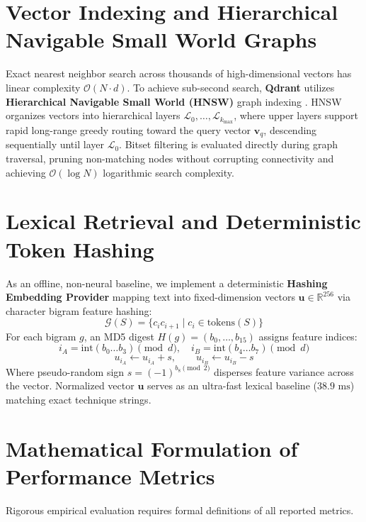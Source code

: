\section{Vector Indexing and Hierarchical Navigable Small World Graphs}
\label{sec:theory_hnsw}
Exact nearest neighbor search across thousands of high-dimensional vectors has linear complexity $\mathcal{O}(N \cdot d)$. To achieve sub-second search, \textbf{Qdrant} utilizes \textbf{Hierarchical Navigable Small World (HNSW)} graph indexing \cite{malkov2018hnsw}. HNSW organizes vectors into hierarchical layers $\mathcal{L}_0, \dots, \mathcal{L}_{k_{\text{max}}}$, where upper layers support rapid long-range greedy routing toward the query vector $\mathbf{v}_q$, descending sequentially until layer $\mathcal{L}_0$. Bitset filtering is evaluated directly during graph traversal, pruning non-matching nodes without corrupting connectivity and achieving $\mathcal{O}(\log N)$ logarithmic search complexity.

\section{Lexical Retrieval and Deterministic Token Hashing}
\label{sec:theory_hashing}
As an offline, non-neural baseline, we implement a deterministic \textbf{Hashing Embedding Provider} mapping text into fixed-dimension vectors $\mathbf{u} \in \mathbb{R}^{256}$ via character bigram feature hashing:
\begin{equation}
\label{eq:ngrams}
\mathcal{G}(S) = \{c_i c_{i+1} \mid c_i \in \text{tokens}(S)\}
\end{equation}
For each bigram $g$, an MD5 digest $H(g) = (b_0, \dots, b_{15})$ assigns feature indices:
\begin{equation}
\label{eq:hash_indices}
i_A = \text{int}(b_0 \dots b_3) \pmod d, \quad i_B = \text{int}(b_4 \dots b_7) \pmod d
\end{equation}
\begin{equation}
\label{eq:hash_accum}
u_{i_A} \leftarrow u_{i_A} + s, \qquad u_{i_B} \leftarrow u_{i_B} - s
\end{equation}
Where pseudo-random sign $s = (-1)^{b_8 \pmod 2}$ disperses feature variance across the vector. Normalized vector $\mathbf{u}$ serves as an ultra-fast lexical baseline ($38.9\text{ ms}$) matching exact technique strings.

\section{Mathematical Formulation of Performance Metrics}
\label{sec:theory_metrics}
Rigorous empirical evaluation requires formal definitions of all reported metrics.

